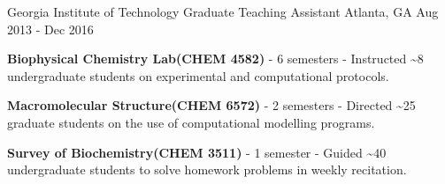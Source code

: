 \begin{cventries}

  \cventry
    {Georgia Institute of Technology} %
    {Graduate Teaching Assistant} %
    {Atlanta, GA} %
    {Aug 2013 - Dec 2016} %
    {
      \begin{cvitems} %
        \item {\textbf{Biophysical Chemistry Lab{\scriptsize (CHEM 4582)}} - 6 semesters - Instructed \textasciitilde8 undergraduate students on experimental and computational protocols.}
        \item {\textbf{Macromolecular Structure{\scriptsize (CHEM 6572)}} - 2 semesters - Directed \textasciitilde25 graduate students on the use of computational modelling programs.}
        \item {\textbf{Survey of Biochemistry{\scriptsize (CHEM 3511)}} - 1 semester - Guided \textasciitilde40 undergraduate students to solve homework problems in weekly recitation.}
      \end{cvitems}
    }


\end{cventries}
